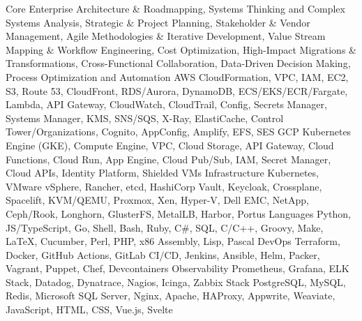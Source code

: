 \begin{cvskills}
    \cvskill
        { Core }
        {
          Enterprise Architecture \& Roadmapping,
          Systems Thinking and Complex Systems Analysis,
          Strategic \& Project Planning,
          Stakeholder \& Vendor Management,
          Agile Methodologies \& Iterative Development,
          Value Stream Mapping \& Workflow Engineering,
          Cost Optimization,
          High-Impact Migrations \& Transformations,
          Cross-Functional Collaboration,
          Data-Driven Decision Making,
          Process Optimization and Automation
        }
    \cvskill
        { AWS }
        {
          CloudFormation,
          VPC,
          IAM,
          EC2,
          S3,
          Route 53,
          CloudFront,
          RDS/Aurora,
          DynamoDB,
          ECS/EKS/ECR/Fargate,
          Lambda,
          API Gateway,
          CloudWatch,
          CloudTrail,
          Config,
          Secrets Manager,
          Systems Manager,
          KMS,
          SNS/SQS,
          X-Ray,
          ElastiCache,
          Control Tower/Organizations,
          Cognito,
          AppConfig,
          Amplify,
          EFS,
          SES
        }
    \cvskill
        { GCP }
        {
          Kubernetes Engine (GKE),
          Compute Engine,
          VPC,
          Cloud Storage,
          API Gateway,
          Cloud Functions,
          Cloud Run,
          App Engine,
          Cloud Pub/Sub,
          IAM,
          Secret Manager,
          Cloud APIs,
          Identity Platform,
          Shielded VMs
        }
    \cvskill
        { Infrastructure }
        {
          Kubernetes,
          VMware vSphere,
          Rancher,
          etcd,
          HashiCorp Vault,
          Keycloak,
          Crossplane,
          Spacelift,
          KVM/QEMU,
          Proxmox,
          Xen,
          Hyper-V,
          Dell EMC,
          NetApp,
          Ceph/Rook,
          Longhorn,
          GlusterFS,
          MetalLB,
          Harbor,
          Portus
        }
    \cvskill
        { Languages }
        {
          Python,
          JS/TypeScript,
          Go,
          Shell,
          Bash,
          Ruby,
          C\#,
          SQL,
          C/C++,
          Groovy,
          Make,
          LaTeX,
          Cucumber,
          Perl,
          PHP,
          x86 Assembly,
          Lisp,
          Pascal
        }
    \cvskill
        { DevOps }
        {
          Terraform,
          Docker,
          GitHub Actions,
          GitLab CI/CD,
          Jenkins,
          Ansible,
          Helm,
          Packer,
          Vagrant,
          Puppet,
          Chef,
          Devcontainers
        }
    \cvskill
        { Observability }
        {
          Prometheus,
          Grafana,
          ELK Stack,
          Datadog,
          Dynatrace,
          Nagios,
          Icinga,
          Zabbix
        }
    \cvskill
        { Stack }
        {
          PostgreSQL,
          MySQL,
          Redis,
          Microsoft SQL Server,
          Nginx,
          Apache,
          HAProxy,
          Appwrite,
          Weaviate,
          JavaScript,
          HTML,
          CSS,
          Vue.js,
          Svelte
        }

\end{cvskills}
